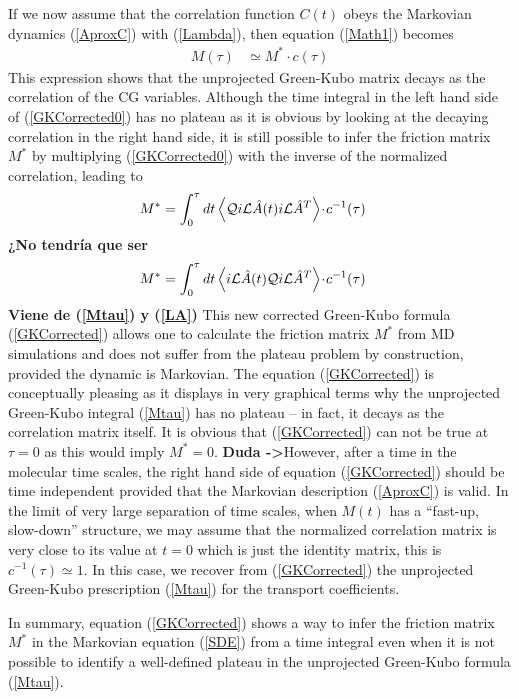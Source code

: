 \documentclass[b5paper,openright,10pt]{book}
\newcommand{\esc}{\!\cdot\!}
\newcommand{\Note}[1]{{\bf \color{red}#1}}    %
\newcommand{\llangle}{\left\langle}
\newcommand{\rrangle}{\right\rangle}
\begin{document}
If  we now  assume  that  the correlation  function  $C(t)$ obeys  the
Markovian   dynamics   (\ref{AproxC})    with   (\ref{Lambda}),   then
equation (\ref{Math1}) becomes
\begin{align}
M(\tau)&\simeq M^*\esc c(\tau)
\label{GKCorrected0}
\end{align}
This expression shows that the unprojected Green-Kubo matrix decays as the correlation
of the CG variables.
Although   the   time   integral   in    the   left   hand   side   of
(\ref{GKCorrected0}) has  no plateau as  it is obvious by  looking at
the decaying correlation in the right  hand side, it is still possible
to infer the friction matrix $M^*$ by multiplying (\ref{GKCorrected0})
with the inverse of the normalized correlation, leading to
\begin{align}
M^*&= \int_0^{\tau} dt \llangle {\cal Q} i{\cal L}\hat{A} (t)i{\cal L}\hat{A}^T\rrangle\esc  c^{-1}(\tau)
\label{GKCorrected}
\end{align}
\Note{¿No tendría que ser
\begin{align}
    M^*&= \int_0^{\tau} dt \llangle i{\cal L}\hat{A} (t) {\cal Q}i{\cal L}\hat{A}^T\rrangle\esc  c^{-1}(\tau)
\label{GKCorrected}
\end{align}
Viene de (\ref{Mtau}) y (\ref{LA})
}
This new  corrected Green-Kubo formula (\ref{GKCorrected})  allows one
to calculate  the friction matrix  $M^*$ from MD simulations  and does
not  suffer from  the plateau  problem by  construction, provided  the
dynamic is Markovian. The equation   (\ref{GKCorrected}) is conceptually pleasing
as it  displays in  very graphical terms  why the unprojected Green-Kubo
integral  (\ref{Mtau}) has  no plateau  -- in  fact, it  decays as  the
correlation matrix itself.  It is obvious that (\ref{GKCorrected}) can
not be true at $\tau=0$ as this would imply $M^*=0$.  \Note{Duda ->}However, after a
time  in  the molecular  time  scales,  the  right  hand side  of  equation
(\ref{GKCorrected})  should  be  time independent  provided  that  the
Markovian description (\ref{AproxC})  is valid.  In the  limit of very
large  separation  of  time  scales,  when  $M(t)$  has  a  ``fast-up,
slow-down'' structure,  we may assume that  the normalized correlation
matrix is very close to its value  at $t=0$ which is just the identity
matrix, this  is $  c^{-1}(\tau)\simeq 1$.  In  this case,  we recover
from   (\ref{GKCorrected})   the unprojected   Green-Kubo   prescription
(\ref{Mtau}) for the transport coefficients.


In summary, equation (\ref{GKCorrected}) shows  a way to infer the friction
matrix  $M^*$  in  the  Markovian equation  (\ref{SDE})  from  a  time
integral  even when  it is  not  possible to  identify a  well-defined
plateau in the unprojected Green-Kubo formula (\ref{Mtau}).
\end{document}
